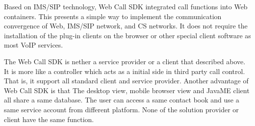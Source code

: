 Based on IMS/SIP technology, Web Call SDK integrated call functions into Web containers. This presents a simple way to implement the communication convergence of Web, IMS/SIP network, and CS networks. It does not require the installation of the plug-in clients on the browser or other special client software as most VoIP services.

The Web Call SDK is nether a service provider or a client that described above. It is more like a controller which acts as a initial side in third party call control. That is, it support all standard client and service provider. Another advantage of Web Call SDK is that The desktop view, mobile browser view and JavaME client all share a same database. The user can access a same contact book and use a same service account from different platform. None of the solution provider or client have the same function.







